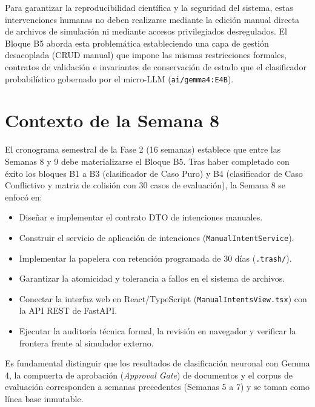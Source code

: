 \documentclass[11pt,a4paper]{article}
\begin{document}
Para garantizar la reproducibilidad científica y la seguridad del sistema, estas intervenciones humanas no deben realizarse mediante la edición manual directa de archivos de simulación ni mediante accesos privilegiados desregulados. El Bloque B5 aborda esta problemática estableciendo una capa de gestión desacoplada (CRUD manual) que impone las mismas restricciones formales, contratos de validación e invariantes de conservación de estado que el clasificador probabilístico gobernado por el micro-LLM (\texttt{ai/gemma4:E4B}).

\section{Contexto de la Semana 8}

El cronograma semestral de la Fase 2 (16 semanas) establece que entre las Semanas 8 y 9 debe materializarse el Bloque B5. Tras haber completado con éxito los bloques B1 a B3 (clasificador de Caso Puro) y B4 (clasificador de Caso Conflictivo y matriz de colisión con 30 casos de evaluación), la Semana 8 se enfocó en:
\begin{itemize}[itemsep=2pt]
    \item Diseñar e implementar el contrato DTO de intenciones manuales.
    \item Construir el servicio de aplicación de intenciones (\texttt{ManualIntentService}).
    \item Implementar la papelera con retención programada de 30 días (\texttt{.trash/}).
    \item Garantizar la atomicidad y tolerancia a fallos en el sistema de archivos.
    \item Conectar la interfaz web en React/TypeScript (\texttt{ManualIntentsView.tsx}) con la API REST de FastAPI.
    \item Ejecutar la auditoría técnica formal, la revisión en navegador y verificar la frontera frente al simulador externo.
\end{itemize}

Es fundamental distinguir que los resultados de clasificación neuronal con Gemma 4, la compuerta de aprobación (\textit{Approval Gate}) de documentos y el corpus de evaluación corresponden a semanas precedentes (Semanas 5 a 7) y se toman como línea base inmutable.
\end{document}
